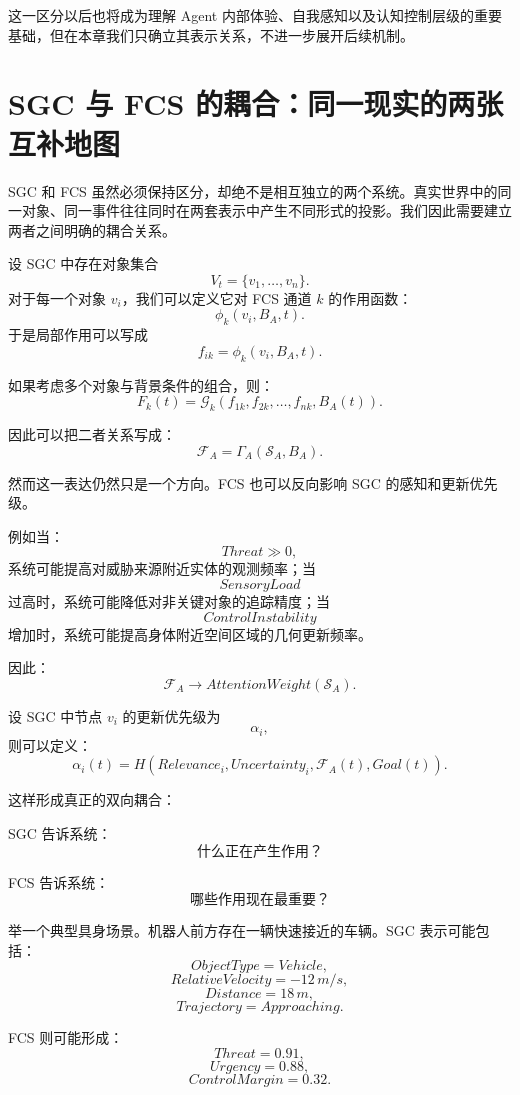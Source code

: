 这一区分以后也将成为理解 Agent 内部体验、自我感知以及认知控制层级的重要基础，但在本章我们只确立其表示关系，不进一步展开后续机制。


\section{SGC 与 FCS 的耦合：同一现实的两张互补地图}

SGC 和 FCS 虽然必须保持区分，却绝不是相互独立的两个系统。真实世界中的同一对象、同一事件往往同时在两套表示中产生不同形式的投影。我们因此需要建立两者之间明确的耦合关系。

设 SGC 中存在对象集合
\[
V_t=\{v_1,\ldots,v_n\}.
\]
对于每一个对象 $v_i$，我们可以定义它对 FCS 通道 $k$ 的作用函数：
\[
\phi_k(v_i,B_A,t).
\]
于是局部作用可以写成
\[
f_{ik}
=
\phi_k(v_i,B_A,t).
\]

如果考虑多个对象与背景条件的组合，则：
\[
F_k(t)
=
\mathcal G_k
\left(
f_{1k},f_{2k},\ldots,f_{nk},
B_A(t)
\right).
\]

因此可以把二者关系写成：
\[
\boxed{
\mathcal F_A
=
\Gamma_A
(
\mathcal S_A,
B_A
).
}
\]

然而这一表达仍然只是一个方向。FCS 也可以反向影响 SGC 的感知和更新优先级。

例如当：
\[
Threat\gg 0,
\]
系统可能提高对威胁来源附近实体的观测频率；当
\[
SensoryLoad
\]
过高时，系统可能降低对非关键对象的追踪精度；当
\[
ControlInstability
\]
增加时，系统可能提高身体附近空间区域的几何更新频率。

因此：
\[
\mathcal F_A
\rightarrow
AttentionWeight(\mathcal S_A).
\]

设 SGC 中节点 $v_i$ 的更新优先级为
\[
\alpha_i,
\]
则可以定义：
\[
\alpha_i(t)
=
H
\left(
Relevance_i,
Uncertainty_i,
\mathcal F_A(t),
Goal(t)
\right).
\]

这样形成真正的双向耦合：
\begin{statementbox}
\centering
{}
\end{statementbox}

SGC 告诉系统：
\[
\text{什么正在产生作用？}
\]

FCS 告诉系统：
\[
\text{哪些作用现在最重要？}
\]

举一个典型具身场景。机器人前方存在一辆快速接近的车辆。SGC 表示可能包括：
\[
ObjectType=Vehicle,
\]
\[
RelativeVelocity=-12\,m/s,
\]
\[
Distance=18\,m,
\]
\[
Trajectory=Approaching.
\]

FCS 则可能形成：
\[
Threat=0.91,
\]
\[
Urgency=0.88,
\]
\[
ControlMargin=0.32.
\]

